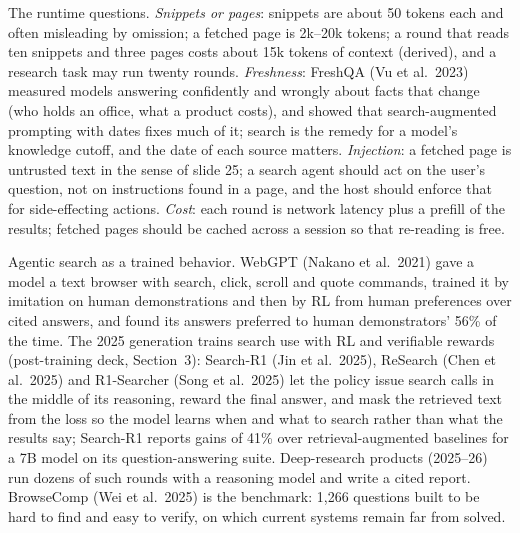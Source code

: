 \documentclass[11pt,letterpaper]{article}
\begin{document}
The runtime questions. \emph{Snippets or pages}: snippets are about 50 tokens each and often misleading by omission; a fetched page is 2k--20k tokens; a round that reads ten snippets and three pages costs about 15k tokens of context (derived), and a research task may run twenty rounds. \emph{Freshness}: FreshQA (Vu et al.\ 2023) measured models answering confidently and wrongly about facts that change (who holds an office, what a product costs), and showed that search-augmented prompting with dates fixes much of it; search is the remedy for a model's knowledge cutoff, and the date of each source matters. \emph{Injection}: a fetched page is untrusted text in the sense of slide 25; a search agent should act on the user's question, not on instructions found in a page, and the host should enforce that for side-effecting actions. \emph{Cost}: each round is network latency plus a prefill of the results; fetched pages should be cached across a session so that re-reading is free.

Agentic search as a trained behavior. WebGPT (Nakano et al.\ 2021) gave a model a text browser with search, click, scroll and quote commands, trained it by imitation on human demonstrations and then by RL from human preferences over cited answers, and found its answers preferred to human demonstrators' 56\% of the time. The 2025 generation trains search use with RL and verifiable rewards (post-training deck, Section~3): Search-R1 (Jin et al.\ 2025), ReSearch (Chen et al.\ 2025) and R1-Searcher (Song et al.\ 2025) let the policy issue search calls in the middle of its reasoning, reward the final answer, and mask the retrieved text from the loss so the model learns when and what to search rather than what the results say; Search-R1 reports gains of 41\% over retrieval-augmented baselines for a 7B model on its question-answering suite. Deep-research products (2025--26) run dozens of such rounds with a reasoning model and write a cited report. BrowseComp (Wei et al.\ 2025) is the benchmark: 1,266 questions built to be hard to find and easy to verify, on which current systems remain far from solved.
\end{document}
